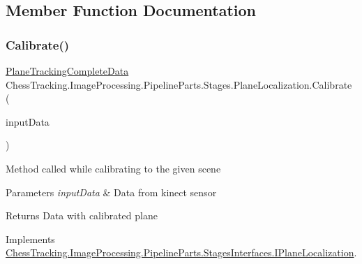 \subsection{Member Function Documentation}
\mbox{\label{class_chess_tracking_1_1_image_processing_1_1_pipeline_parts_1_1_stages_1_1_plane_localization_a85e3456fc26b865f16bb985efd5e41a7}} 
\subsubsection{\texorpdfstring{Calibrate()}{Calibrate()}}
{\footnotesize\ttfamily \mbox{\hyperlink{class_chess_tracking_1_1_image_processing_1_1_pipeline_data_1_1_plane_tracking_complete_data}{Plane\+Tracking\+Complete\+Data}} Chess\+Tracking.\+Image\+Processing.\+Pipeline\+Parts.\+Stages.\+Plane\+Localization.\+Calibrate (\begin{DoxyParamCaption}\item[{\mbox{\hyperlink{class_chess_tracking_1_1_image_processing_1_1_pipeline_data_1_1_input_data}{Input\+Data}}}]{input\+Data }\end{DoxyParamCaption})}



Method called while calibrating to the given scene 


\begin{DoxyParams}{Parameters}
{\em input\+Data} & Data from kinect sensor\\
\hline
\end{DoxyParams}
\begin{DoxyReturn}{Returns}
Data with calibrated plane
\end{DoxyReturn}


Implements \mbox{\hyperlink{interface_chess_tracking_1_1_image_processing_1_1_pipeline_parts_1_1_stages_interfaces_1_1_i_plane_localization_a51e84fb5106e34dbe4f2775b82fb2a7e}{Chess\+Tracking.\+Image\+Processing.\+Pipeline\+Parts.\+Stages\+Interfaces.\+I\+Plane\+Localization}}.

\mbox{\label{class_chess_tracking_1_1_image_processing_1_1_pipeline_parts_1_1_stages_1_1_plane_localization_a37055795945cfe41324cbc59e3563b2e}} 
